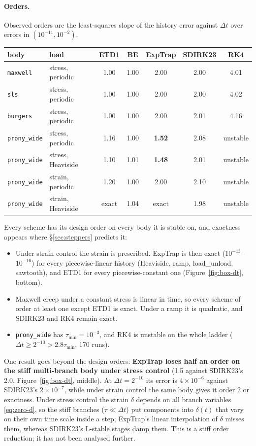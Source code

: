 \documentclass[11pt]{article}
\numberwithin{equation}{section}
\newcommand{\code}[1]{\texttt{#1}}
\begin{document}
\paragraph{Orders.}
Observed orders are the least-squares slope of the history error against
$\Delta t$ over errors in $(10^{-11},10^{-2})$.
\begin{center}
\small
\begin{tabular}{@{}llccccc@{}}
\toprule
body & load & ETD1 & BE & ExpTrap & SDIRK23 & RK4 \\
\midrule
\code{maxwell} & stress, periodic & 1.00 & 1.00 & 2.00 & 2.00 & 4.01 \\
\code{sls} & stress, periodic & 1.00 & 1.00 & 2.00 & 2.00 & 4.02 \\
\code{burgers} & stress, periodic & 1.00 & 1.00 & 2.00 & 2.01 & 4.16 \\
\code{prony\_wide} & stress, periodic & 1.16 & 1.00 & \textbf{1.52} & 2.08 & unstable \\
\code{prony\_wide} & stress, Heaviside & 1.10 & 1.01 & \textbf{1.48} & 2.01 & unstable \\
\code{prony\_wide} & strain, periodic & 1.20 & 1.00 & 2.00 & 2.10 & unstable \\
\code{prony\_wide} & strain, Heaviside & exact & 1.04 & exact & 1.98 & unstable \\
\bottomrule
\end{tabular}
\end{center}
Every scheme has its design order on every body it is stable on, and
exactness appears where \S\ref{sec:steppers} predicts it:
\begin{itemize}[leftmargin=*]
\item Under strain control the strain is prescribed. ExpTrap is then
  exact ($10^{-13}$--$10^{-16}$) for every piecewise-linear history
  (Heaviside, ramp, load\_unload, sawtooth), and ETD1 for every
  piecewise-constant one (Figure~\ref{fig:box-dt}, bottom).
\item Maxwell creep under a constant stress is linear in time, so
  every scheme of order at least one except ETD1 is exact. Under a ramp
  it is quadratic, and SDIRK23 and RK4 remain exact.
\item \code{prony\_wide} has $\tau_{\min}=10^{-3}$, and RK4 is unstable on
  the whole ladder ($\Delta t\ge 2^{-10}>2.8\tau_{\min}$, 170 runs).
\end{itemize}
One result goes beyond the design orders: \textbf{ExpTrap loses half an
order on the stiff multi-branch body under stress control} (1.5 against
SDIRK23's 2.0, Figure~\ref{fig:box-dt}, middle). At $\Delta t=2^{-10}$ its
error is $4\times10^{-6}$ against SDIRK23's $2\times10^{-7}$, while under
strain control the same body gives it order 2 or exactness. Under stress
control the strain $\delta$ depends on all branch variables
\eqref{eq:zero-d}, so the stiff branches ($\tau\ll\Delta t$) put
components into $\delta(t)$ that vary on their own time scale inside a
step; ExpTrap's linear interpolation of $\delta$ misses them, whereas
SDIRK23's L-stable stages damp them. This is a stiff order reduction; it
has not been analysed further.
\end{document}
